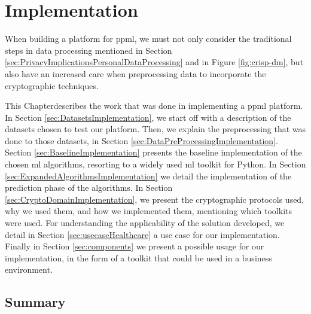%

\acresetall

\chapter{Implementation}
\label{ch:Implementation}

When building a platform for \ac{ppml}, we must not only consider the traditional steps in data processing mentioned in Section \ref{sec:PrivacyImplicationsPersonalDataProcessing} and in Figure \ref{fig:crisp-dm}, but also have an increased care when preprocessing data to incorporate the cryptographic techniques.

This Chapterdescribes the work that was done in implementing a \ac{ppml} platform. In Section \ref{sec:DatasetsImplementation}, we start off with a description of the datasets chosen to test our platform. Then, we explain the preprocessing that was done to those datasets, in Section \ref{sec:DataPreProcessingImplementation}.
Section \ref{sec:BaselineImplementation} presents the baseline implementation of the chosen \ac{ml} algorithms, resorting to a widely used \ac{ml} toolkit for Python.
In Section \ref{sec:ExpandedAlgorithmsImplementation} we detail the implementation of the prediction phase of the algorithms.
In Section \ref{sec:CryptoDomainImplementation}, we present the cryptographic protocols used, why we used them, and how we implemented them, mentioning which toolkits were used.
For understanding the applicability of the solution developed, we detail in Section \ref{sec:usecaseHealthcare} a use case for our implementation. Finally in Section \ref{sec:components} we present a possible usage for our implementation, in the form of a toolkit that could be used in a business environment.










  
\section{Summary}
\label{sec:SummaryImplementation}


